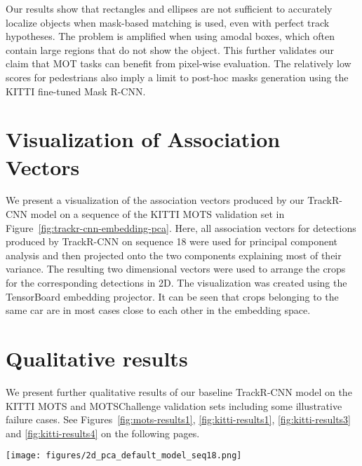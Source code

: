 \documentclass[10pt,twocolumn,letterpaper]{article}
\begin{document}
Our results show that rectangles and ellipses are not sufficient to accurately localize objects when mask-based matching is used, even with perfect track hypotheses. The problem is amplified when using amodal boxes, which often contain large regions that do not show the object. This further validates our claim that MOT tasks can benefit from pixel-wise evaluation. The relatively low scores for pedestrians also imply a limit to post-hoc masks generation using the KITTI fine-tuned Mask R-CNN.

\section{Visualization of Association Vectors}
We present a visualization of the association vectors produced by our TrackR-CNN model on a sequence of the KITTI MOTS validation set in Figure~\ref{fig:trackr-cnn-embedding-pca}. Here, all association vectors for detections produced by TrackR-CNN on sequence 18 were used for principal component analysis and then projected onto the two components explaining most of their variance. The resulting two dimensional vectors were used to arrange the crops for the corresponding detections in 2D. The visualization was created using the TensorBoard embedding projector. It can be seen that crops belonging to the same car are in most cases close to each other in the embedding space.

\section{Qualitative results}
We present further qualitative results of our baseline TrackR-CNN model on the KITTI MOTS and MOTSChallenge validation sets including some illustrative failure cases. See Figures~\ref{fig:mots-results1}, \ref{fig:kitti-results1}, \ref{fig:kitti-results3} and \ref{fig:kitti-results4} on the following pages.


\begin{figure*}[t!]
	\centering
	\texttt{[image: figures/2d\_pca\_default\_model\_seq18.png]}
	\caption{\textbf{Visualization using PCA on the association vectors of detections generated by TrackR-CNN on sequence 18 of KITTI MOTS.} Detections with similar appearance are grouped together by minimizing the association loss.}
	\label{fig:trackr-cnn-embedding-pca}
\end{figure*}
\end{document}
